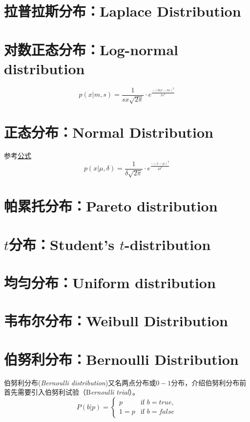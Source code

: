 \documentclass[11pt]{book}
\newcounter{#2}
\newcounter{#2}[#1]
\numberwithin{#2}{#1}
\begin{document}
		\section{拉普拉斯分布：Laplace Distribution}
		\section{对数正态分布：Log-normal distribution}
			\begin{equation}
				p(x|m,s) = \frac{1}{sx \sqrt{2\pi}}\cdot e^{\frac{-(lnx-m)^2}{2s^2}}
			\end{equation}
		\section{正态分布：Normal Distribution}
			参考\hyperref[normal_distribution_function]{公式}
			\begin{equation}
				p(x|\mu,\delta) = \frac{1}{\delta \sqrt{2\pi}}\cdot e^{\frac{-(x-\mu)^2}{2\delta^2}}
			\end{equation}\label{normal_distribution_function}
		\section{帕累托分布：Pareto distribution}
		\section{$ t $分布：Student's $ t $-distribution}
		\section{均匀分布：Uniform distribution}
		\section{韦布尔分布：Weibull Distribution}
		
		\section{伯努利分布：Bernoulli Distribution}
			伯努利分布(\textit{Bernoulli distribution})又名两点分布或$ 0-1 $分布，介绍伯努利分布前首先需要引入伯努利试验（B\textit{ernoulli trial}）。
			\begin{equation}
				P(b|p)= \begin{cases}
					p & \text{if }  b =true,\\
					1=p & \text{if }   b =false
				\end{cases}
			\end{equation}
		
\end{document}
